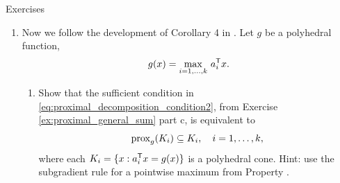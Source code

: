 \begin{xcb}{Exercises}
\begin{enumerate}[label=\thechapter.\arabic*]
\begin{enumerate}[label=\alph*.]
\item First show that, for any $x$, the point $\prox_f(\prox_g(x))$ satisfies  
  \[
  0 \in \prox_f(\prox_g(x)) - x + \partial g(\prox_g(x)) + 
  \partial f \big( \prox_f(\prox_g(x)) \big).
  \]
  Hint: use the proximal subgradient characterization
  \eqref{eq:proximal_subgradient_characterization} for $\prox_f(\prox_g(x))$, 
  as well as for $\prox_g(x)$, and add these two expressions together. 

\item Assume that 
  \begin{equation}
  \label{eq:proximal_decomposition_condition1}
  \partial g(x) \subseteq \partial g(\prox_f(x)), \quad \text{for all $x$}. 
  \end{equation}
  Show that, for any $x$, the point $\prox_f(\prox_g(x))$ must then satisfy   
  \[
  0 \in \prox_f(\prox_g(x)) - x + \partial g \big( \prox_f(\prox_g(x)) \big) +  
  \partial f \big( \prox_f(\prox_g(x)) \big).
  \]
  Hint: use part a. Conclude using the subgradient characterization for
  $\prox_{f+g}(x)$ and single-valuedness of the proximal map that
  $\prox_{f+g}(x) = \prox_f(\prox_g(x))$, and as $x$ was arbitrary,
  $\prox_{f+g} =  \prox_f \circ \prox_g$.   

\item Let , with each $g_i$ closed and convex, 
  and . Prove that
  \eqref{eq:proximal_decomposition_condition1} is implied by
  \begin{equation}
  \label{eq:proximal_decomposition_condition2}
  \partial g_i(x) \subseteq \partial g_i(\prox_f(x)), \quad \text{for all $x$, 
    and $i=1,\ldots,k$},  
  \end{equation}
  and thus the latter is a sufficient condition for $\prox_{f+g} =  \prox_f \circ
  \prox_g$. 
\end{enumerate}

\item \label{ex:generalized_tv_proximal_mapping}
  Now we follow the development of Corollary 4 in \cite{yu2013decomposing}. Let
  $g$ be a polyhedral function, 
  \[
  g(x) = \max_{i=1,\ldots,k} \, a_i^{\mathsf{T}} x.
  \]
  
\begin{enumerate}[label=\alph*.]
\item Show that the sufficient condition in
  \eqref{eq:proximal_decomposition_condition2}, from Exercise
  \ref{ex:proximal_general_sum} part c, is equivalent to  
  \[
  \operatorname{prox}_g(K_i) \subseteq K_i, \quad i=1,\ldots,k,
  \]
  where each $K_i = \{x : a_i^{\mathsf{T}} x = g(x)\}$ is a polyhedral cone. Hint: use the
  subgradient rule for a pointwise maximum from Property
  .   


\end{enumerate}
\end{enumerate}
\end{xcb}
